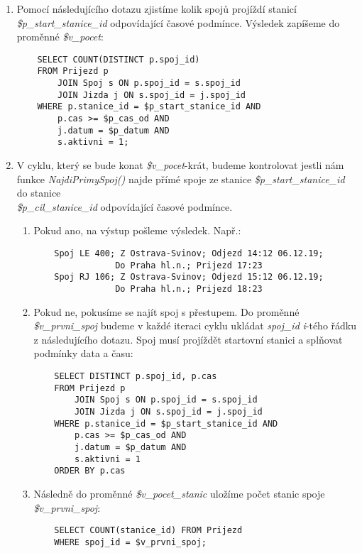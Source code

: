 \documentclass[11pt]{article}
\begin{document}
\begin{enumerate}
    \item Pomocí následujícího dotazu zjistíme kolik spojů projíždí stanicí \textit{\$p\_start\_stanice\_id} odpovídající časové podmínce. Výsledek zapíšeme do proměnné \textit{\$v\_pocet}:
    \begin{lstlisting}
    SELECT COUNT(DISTINCT p.spoj_id)
    FROM Prijezd p
        JOIN Spoj s ON p.spoj_id = s.spoj_id
        JOIN Jizda j ON s.spoj_id = j.spoj_id
    WHERE p.stanice_id = $p_start_stanice_id AND 
        p.cas >= $p_cas_od AND 
        j.datum = $p_datum AND
        s.aktivni = 1;
    \end{lstlisting}
    
    \item V cyklu, který se bude konat \textit{\$v\_pocet}-krát, budeme kontrolovat jestli nám funkce \mbox{\textit{NajdiPrimySpoj()}} najde přímé spoje ze stanice \textit{\$p\_start\_stanice\_id} do stanice \\ \textit{\$p\_cil\_stanice\_id} odpovídající časové podmínce.
    
    \begin{enumerate}
        \item Pokud ano, na výstup pošleme výsledek. Např.:
        \begin{lstlisting}
    Spoj LE 400; Z Ostrava-Svinov; Odjezd 14:12 06.12.19;
                Do Praha hl.n.; Prijezd 17:23
    Spoj RJ 106; Z Ostrava-Svinov; Odjezd 15:12 06.12.19;
                Do Praha hl.n.; Prijezd 18:23
        \end{lstlisting}

        \item Pokud ne, pokusíme se najít spoj s přestupem. Do proměnné \textit{\$v\_prvni\_spoj} budeme v každé iteraci cyklu ukládat \textit{spoj\_id} \textit{i}-tého řádku z následujícího dotazu. Spoj musí projíždět startovní stanici a splňovat podmínky data a času:
        \begin{lstlisting}
    SELECT DISTINCT p.spoj_id, p.cas
    FROM Prijezd p
        JOIN Spoj s ON p.spoj_id = s.spoj_id
        JOIN Jizda j ON s.spoj_id = j.spoj_id
    WHERE p.stanice_id = $p_start_stanice_id AND
        p.cas >= $p_cas_od AND 
        j.datum = $p_datum AND
        s.aktivni = 1
    ORDER BY p.cas
        \end{lstlisting}

        \item Následně do proměnné \textit{\$v\_pocet\_stanic} uložíme počet stanic spoje \textit{\$v\_prvni\_spoj}:
        \begin{lstlisting}
    SELECT COUNT(stanice_id) FROM Prijezd
    WHERE spoj_id = $v_prvni_spoj;
        \end{lstlisting}


\end{enumerate}
\end{enumerate}
\end{document}
